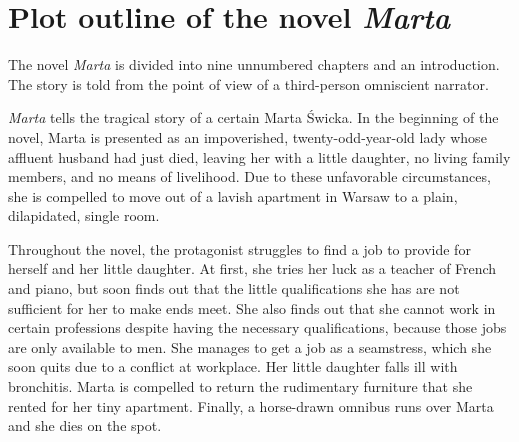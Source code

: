 \section{Plot outline of the novel \textit{Marta}}
The novel \textit{Marta} is divided into nine unnumbered chapters and an introduction. 
The story is told from the point of view of a third-person omniscient narrator.

\textit{Marta} tells the tragical story of a certain Marta Świcka.
In the beginning of the novel, Marta is presented as an impoverished, twenty-odd-year-old lady whose affluent husband had just died, leaving her with a little daughter, no living family members, and no means of livelihood.
Due to these unfavorable circumstances, she is compelled to move out of a lavish apartment in Warsaw to a plain, dilapidated, single room.

Throughout the novel, the protagonist struggles to find a job to provide for herself and her little daughter.
At first, she tries her luck as a teacher of French and piano, but soon finds out that the little qualifications she has are not sufficient for her to make ends meet.
She also finds out that she cannot work in certain professions despite having the necessary qualifications, because those jobs are only available to men.
She manages to get a job as a seamstress, which she soon quits due to a conflict at workplace.
Her little daughter falls ill with bronchitis.
Marta is compelled to return the rudimentary furniture that she rented for her tiny apartment.
Finally, a horse-drawn omnibus runs over Marta and she dies on the spot.